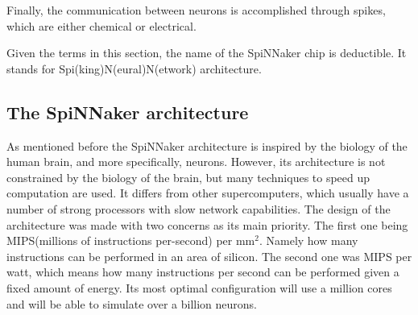 \documentclass[12pt,twosided]{article}
\begin{document}
Finally, the communication between neurons is accomplished through spikes, which are either chemical or electrical\cite{gerstner2002spiking}.

Given the terms in this section, the name of the SpiNNaker chip is deductible. It stands for Spi(king)N(eural)N(etwork) architecture.
\subsection{The SpiNNaker architecture}
As mentioned before the SpiNNaker architecture is inspired by the biology of the human brain, and more specifically, neurons. However, its architecture is not constrained by the biology of the brain, but many techniques to speed up computation are used. It differs from other supercomputers, which  usually have a number of strong processors with slow network capabilities. The design of the architecture was made with two concerns as its main priority. The first one being MIPS(millions of instructions per-second) per mm$^2$. Namely how many instructions can be performed in an area of silicon. The second one was MIPS per watt, which means how many instructions per second can be performed given a fixed amount of energy. Its most optimal configuration will use a million cores and will be able to simulate over a billion neurons\cite{furber2007neural}.
\end{document}

